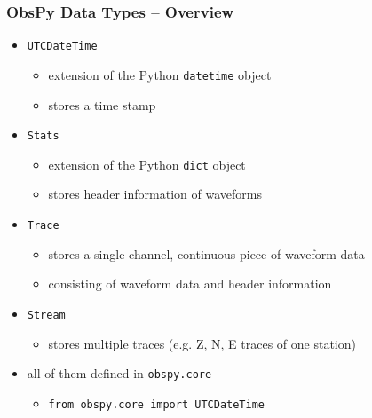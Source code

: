 \documentclass[t,10pt,compress=false,usepdftitle=false]{beamer}
\begin{document}
\begin{frame}[fragile]
    \frametitle{ObsPy Data Types -- Overview}
    \begin{itemize}
    \item \verb#UTCDateTime#
        \begin{itemize}
        \item extension of the Python \verb#datetime# object
        \item stores a time stamp
        \end{itemize}
    \item \verb#Stats#
        \begin{itemize}
        \item extension of the Python \verb#dict# object
        \item stores header information of waveforms
        \end{itemize}
    \item \verb#Trace#
        \begin{itemize}
        \item stores a single-channel, continuous piece of waveform data
        \item consisting of waveform data and header information
        \end{itemize}
    \item \verb#Stream#
        \begin{itemize}
        \item stores multiple traces (e.g. Z, N, E traces of one station)
        \end{itemize}
    \item all of them defined in \verb#obspy.core#
        \begin{itemize}
        \item \verb#from obspy.core import UTCDateTime#
        \end{itemize}
    \end{itemize}
\end{frame}
\end{document}
